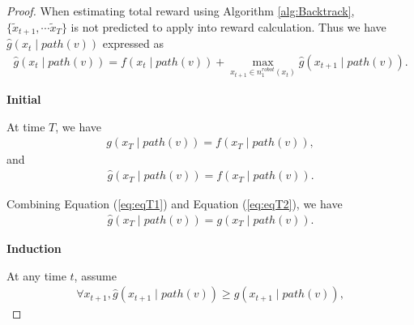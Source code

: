 \documentclass[12pt]{article}
\begin{document}
\begin{lem}
\begin{proof}
When estimating total reward using Algorithm \ref{alg:Backtrack}, $ \{ \tilde{x}_{t+1}, \cdots \tilde{x}_{T} \} $ is not predicted to apply into reward calculation. Thus we have $ \hat{g}(x_{t} \mid path(v)) $ expressed as 
\begin{equation}
\label{eq:defHatG}
\begin{aligned}
\hat{g}(x_{t} \mid path(v)) = f(x_{t} \mid path(v)) + \max_{x_{t+1} \in n^{robot}_{1}(x_{t})} \hat{g}(x_{t+1} \mid path(v)).
\end{aligned}
\end{equation}

\textbf{Initial}

At time $ T $, we have
\begin{equation}
\label{eq:eqT1}
\begin{aligned}
g(x_{T} \mid path(v)) = f(x_{T} \mid path(v)),
\end{aligned}
\end{equation}
and
\begin{equation}
\label{eq:eqT2}
\begin{aligned}
\hat{g}(x_{T} \mid path(v)) = f(x_{T} \mid path(v)).
\end{aligned}
\end{equation}

Combining Equation (\ref{eq:eqT1}) and Equation (\ref{eq:eqT2}), we have
\begin{equation}
\label{eq:inductionInit}
\begin{aligned}
\hat{g}(x_{T} \mid path(v)) = g(x_{T} \mid path(v)).
\end{aligned}
\end{equation}

\textbf{Induction}

At any time $ t $, assume
\begin{equation}
\label{eq:inductionAssumption}
\begin{aligned}
\forall x_{t+1}, \hat{g}(x_{t+1} \mid path(v)) \geq g(x_{t+1} \mid path(v)),
\end{aligned}
\end{equation}


\end{proof}
\end{lem}
\end{document}
